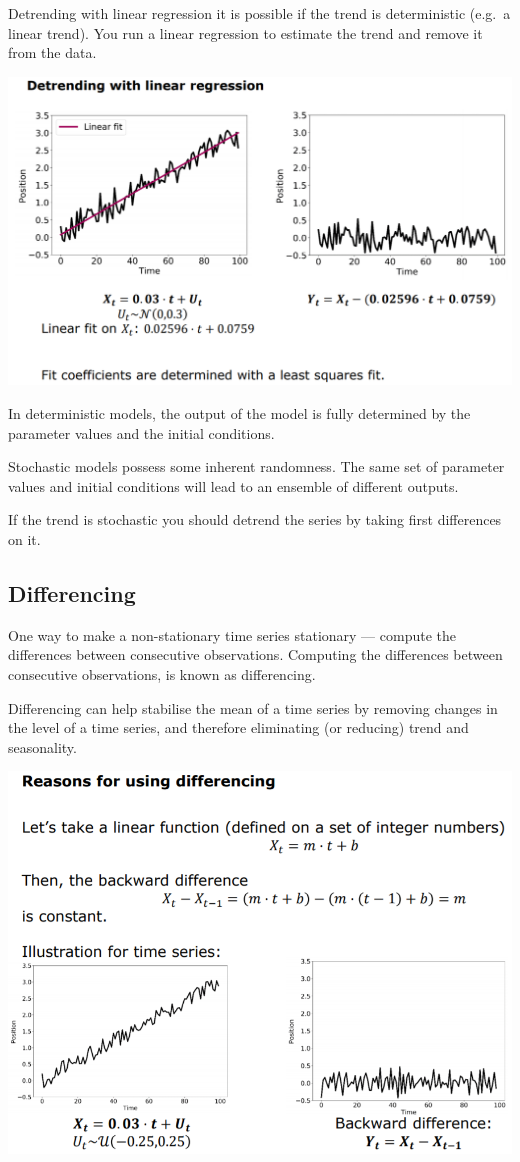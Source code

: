 \documentclass[
]{article}
\begin{document}
Detrending with linear regression it is possible if the trend is
deterministic (e.g.~a linear trend). You run a linear regression to
estimate the trend and remove it from the data.

\includegraphics[width=1\linewidth]{detrend}

In deterministic models, the output of the model is fully determined by
the parameter values and the initial conditions.

Stochastic models possess some inherent randomness. The same set of
parameter values and initial conditions will lead to an ensemble of
different outputs.

If the trend is stochastic you should detrend the series by taking first
differences on it.

\hypertarget{differencing}{%
\subsection{Differencing}\label{differencing}}

One way to make a non-stationary time series stationary --- compute the
differences between consecutive observations. Computing the differences
between consecutive observations, is known as differencing.

Differencing can help stabilise the mean of a time series by removing
changes in the level of a time series, and therefore eliminating (or
reducing) trend and seasonality.

\includegraphics[width=1\linewidth]{rtp_diff}
\end{document}
